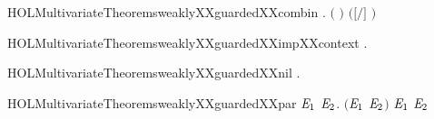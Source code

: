 \newcommand{\HOLMultivariateTheoremsweaklyXXguardedXXbackwardXXrules}{\UseVerbatim{HOLMultivariateTheoremsweaklyXXguardedXXbackwardXXrules}}
\begin{SaveVerbatim}{HOLMultivariateTheoremsweaklyXXguardedXXcombin}
\HOLTokenTurnstile{} \HOLSymConst{\HOLTokenForall{}}  .
         \HOLSymConst{\HOLTokenConj{}}    \HOLSymConst{\HOLTokenConj{}}    \HOLSymConst{\HOLTokenConj{}}
       \ensuremath{(}  \HOLSymConst{\ensuremath{=}}  \ensuremath{)} \HOLSymConst{\HOLTokenImp{}}
         \ensuremath{(}\ensuremath{[}\ensuremath{/}\ensuremath{]} \ensuremath{)}
\end{SaveVerbatim}
\newcommand{\HOLMultivariateTheoremsweaklyXXguardedXXcombin}{\UseVerbatim{HOLMultivariateTheoremsweaklyXXguardedXXcombin}}
\begin{SaveVerbatim}{HOLMultivariateTheoremsweaklyXXguardedXXimpXXcontext}
\HOLTokenTurnstile{} \HOLSymConst{\HOLTokenForall{}} .    \HOLSymConst{\HOLTokenImp{}}   
\end{SaveVerbatim}
\newcommand{\HOLMultivariateTheoremsweaklyXXguardedXXimpXXcontext}{\UseVerbatim{HOLMultivariateTheoremsweaklyXXguardedXXimpXXcontext}}
\begin{SaveVerbatim}{HOLMultivariateTheoremsweaklyXXguardedXXnil}
\HOLTokenTurnstile{} \HOLSymConst{\HOLTokenForall{}}.   
\end{SaveVerbatim}
\newcommand{\HOLMultivariateTheoremsweaklyXXguardedXXnil}{\UseVerbatim{HOLMultivariateTheoremsweaklyXXguardedXXnil}}
\begin{SaveVerbatim}{HOLMultivariateTheoremsweaklyXXguardedXXpar}
\HOLTokenTurnstile{} \HOLSymConst{\HOLTokenForall{}} \ensuremath{\HOLBoundVar{E}\sb{\mathrm{1}}} \ensuremath{\HOLBoundVar{E}\sb{\mathrm{2}}}.
         \ensuremath{(}\ensuremath{\HOLBoundVar{E}\sb{\mathrm{1}}} \HOLSymConst{\ensuremath{\mid}} \ensuremath{\HOLBoundVar{E}\sb{\mathrm{2}}}\ensuremath{)} \HOLSymConst{\HOLTokenImp{}}
         \ensuremath{\HOLBoundVar{E}\sb{\mathrm{1}}} \HOLSymConst{\HOLTokenConj{}}   \ensuremath{\HOLBoundVar{E}\sb{\mathrm{2}}}
\end{SaveVerbatim}
